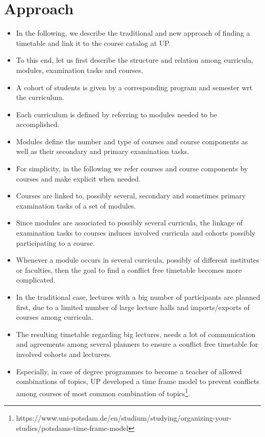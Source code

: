 \documentclass{easychair}
\newcommand{\UP}{UP}
\begin{document}
\section{Approach}
\label{sec:approach}

\begin{itemize}%
  \item%
  In the following, we describe the traditional and new approach of finding a timetable and link it to the course catalog at \UP{}. 
  \item%
  To this end, let us first describe the structure and relation among curricula, modules, examination tasks and courses. 
  \item%
  A cohort of students is given by a corresponding program and semester wrt the curriculum. 
  \item%
  Each curriculum is defined by referring to modules needed to be accomplished. 
  \item%
  Modules define the number and type of courses and course components as well as their secondary and primary examination tasks. 
  \item%
  For simplicity, in the following we refer courses and course components by courses and make explicit when needed. 
  \item%
  Courses are linked to, possibly several, secondary and sometimes primary examination tasks of a set of modules. 
  \item%
  Since modules are associated to possibly several curricula, the linkage of examination tasks to courses induces involved curricula and cohorts possibly participating to a course. 
  \item%
  Whenever a module occurs in several curricula, possibly of different institutes or faculties, then the goal to find a conflict free timetable becomes more complicated. 
  \item%
  In the traditional case, lectures with a big number of participants are planned first, due to a limited number of large lecture halls and imports/exports of courses among curricula. 
  \item%
  The resulting timetable regarding big lectures, needs a lot of communication and agreements among several planners to ensure a conflict free timetable for involved cohorts and lecturers. 
  \item%
  Especially, in case of degree programmes to become a teacher of allowed combinations of topics, \UP{} developed a time frame model to prevent conflicts among courses of most common combination of topics\footnote{https://www.uni-potsdam.de/en/studium/studying/organizing-your-studies/potsdams-time-frame-model}.

\end{itemize}
\end{document}
